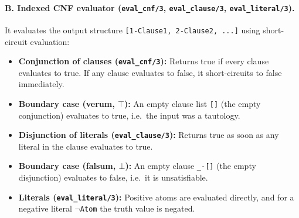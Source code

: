 \documentclass[11pt]{article}
\begin{document}
\paragraph{B. Indexed CNF evaluator (\texttt{eval\_cnf/3}, \texttt{eval\_clause/3}, \texttt{eval\_literal/3}).}
It evaluates the output structure \texttt{[1-Clause1, 2-Clause2, ...]} using
short-circuit evaluation:
\begin{itemize}
    \item \textbf{Conjunction of clauses (\texttt{eval\_cnf/3}):} Returns true if
          every clause evaluates to true. If any clause evaluates to false, it
          short-circuits to false immediately.
    \item \textbf{Boundary case (verum, $\top$):} An empty clause list
          \texttt{[]} (the empty conjunction) evaluates to true, i.e.\ the input
          was a tautology.
    \item \textbf{Disjunction of literals (\texttt{eval\_clause/3}):} Returns true
          as soon as any literal in the clause evaluates to true.
    \item \textbf{Boundary case (falsum, $\bot$):} An empty clause
          \texttt{\_-[]} (the empty disjunction) evaluates to false, i.e.\ it is
          unsatisfiable.
    \item \textbf{Literals (\texttt{eval\_literal/3}):} Positive atoms are
          evaluated directly, and for a negative literal $\neg$\texttt{Atom} the
          truth value is negated.
\end{itemize}
\end{document}

